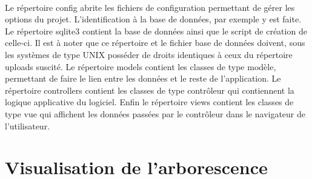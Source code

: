     \paragraph{}
        Le répertoire config abrite les fichiers de configuration permettant de
        gérer les options du projet.
        L'identification à la base de données, par exemple y est faite.
        Le répertoire sqlite3 contient la base de données ainsi que le script de
        création de celle-ci.
        Il est à noter que ce répertoire et le fichier base de données
        doivent, sous les systèmes de type UNIX posséder de droits identiques
        à ceux du répertoire uploads suscité.
        Le répertoire models contient les classes de type modèle, permettant
        de faire le lien entre les données et le reste de l'application.
        Le répertoire controllers contient les classes de type contrôleur qui
        contiennent la logique applicative du logiciel.
        Enfin le répertoire views contient les classes de type vue qui
        affichent les données passées par le contrôleur dans le navigateur de
        l'utilisateur.


\pagebreak
\section{Visualisation de l'arborescence}
